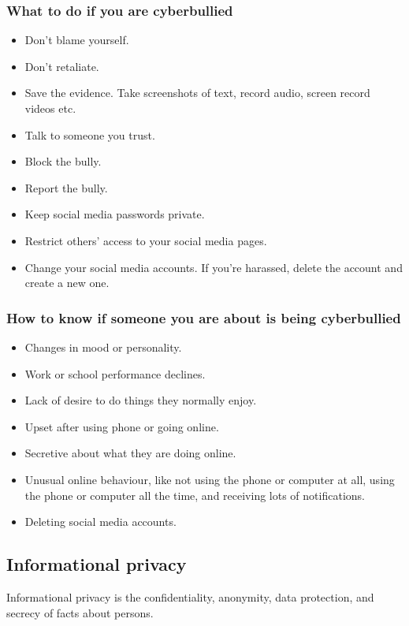 \documentclass[11pt]{article}
\begin{document}
\subsubsection{What to do if you are cyberbullied}
\label{sec:org03d7613}
\begin{itemize}
\item Don't blame yourself.
\item Don't retaliate.
\item Save the evidence. Take screenshots of text, record audio, screen record videos etc.
\item Talk to someone you trust.
\item Block the bully.
\item Report the bully.
\item Keep social media passwords private.
\item Restrict others' access to your social media pages.
\item Change your social media accounts. If you're harassed, delete the account and create a new one.
\end{itemize}

\subsubsection{How to know if someone you are about is being cyberbullied}
\label{sec:org00c78c8}
\begin{itemize}
\item Changes in mood or personality.
\item Work or school performance declines.
\item Lack of desire to do things they normally enjoy.
\item Upset after using phone or going online.
\item Secretive about what they are doing online.
\item Unusual online behaviour, like not using the phone or computer at all, using the phone or computer all the time, and receiving lots of notifications.
\item Deleting social media accounts.
\end{itemize}

\subsection{Informational privacy}
\label{sec:org0b26844}
Informational privacy is the confidentiality, anonymity, data protection, and secrecy of facts about persons.
\end{document}
